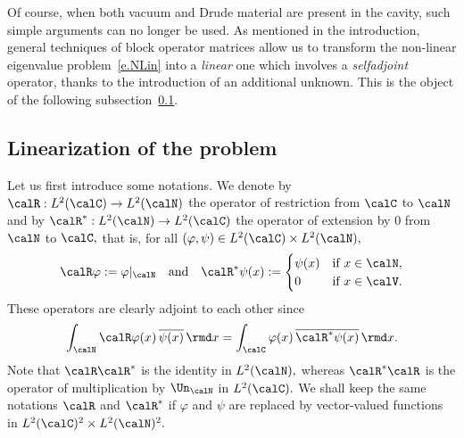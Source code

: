 Of course, when both vacuum and Drude material are present in the cavity, such simple arguments can no longer be used. As mentioned in the introduction, general techniques of block operator matrices allow us to transform the non-linear eigenvalue problem~\eqref{e.NLin} into a \emph{linear} one which involves a \emph{selfadjoint} operator, thanks to the introduction of an additional unknown. This is the object of the following subsection~\ref{s-linear}.

\subsection{Linearization of the problem}\label{s-linear}

Let us first introduce some notations. We denote by $\calR: L^2(\calC) \to L^2(\calN)$ the operator of restriction from $\calC$ to $\calN$ and by $\calR^*: L^2(\calN) \to L^2(\calC)$ the operator of extension by 0 from $\calN$ to $\calC,$ that is, for all $(\varphi,\psi) \in L^2(\calC) \times L^2(\calN),$
\[
\calR \varphi := \varphi|_\calN
\quad\text{and}\quad
\calR^* \psi(x) :=
\begin{cases}
\psi(x) & \text{if }x \in \calN, \\
0 & \text{if }x \in \calV.
\end{cases}
\]
These operators are clearly adjoint to each other since
\[
\int_\calN \calR \varphi(x) \, \overline{\psi(x)} \,\rmd x = \int_\calC \varphi(x) \, \overline{\calR^* \psi(x)} \,\rmd x.
\]
Note that $\calR \calR^*$ is the identity in $L^2(\calN),$ whereas $\calR^* \calR$ is the operator of multiplication by $\Un_\calN$ in $L^2(\calC).$ We shall keep the same notations $\calR$ and $\calR^*$ if $\varphi$ and $\psi$ are replaced by vector-valued functions in $L^2(\calC)^2 \times L^2(\calN)^2.$

